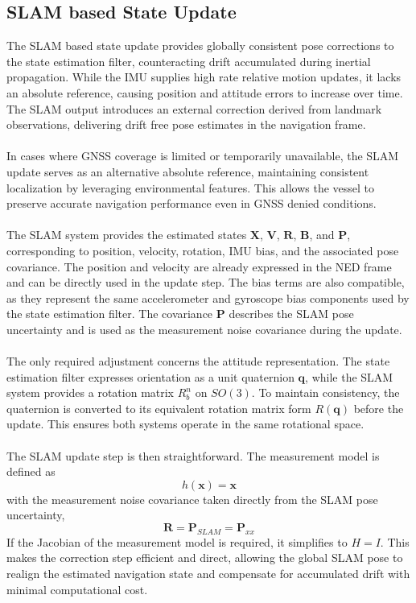 \subsection{SLAM based State Update}
The SLAM based state update provides globally consistent pose corrections to the state estimation filter, counteracting drift accumulated during inertial propagation. While the IMU supplies high rate relative motion updates, it lacks an absolute reference, causing position and attitude errors to increase over time. The SLAM output introduces an external correction derived from landmark observations, delivering drift free pose estimates in the navigation frame.  
\\ \\
In cases where GNSS coverage is limited or temporarily unavailable, the SLAM update serves as an alternative absolute reference, maintaining consistent localization by leveraging environmental features. This allows the vessel to preserve accurate navigation performance even in GNSS denied conditions.
\\ \\
The SLAM system provides the estimated states $\mathbf{X}$, $\mathbf{V}$, $\mathbf{R}$, $\mathbf{B}$, and $\mathbf{P}$, corresponding to position, velocity, rotation, IMU bias, and the associated pose covariance. The position and velocity are already expressed in the NED frame and can be directly used in the update step. The bias terms are also compatible, as they represent the same accelerometer and gyroscope bias components used by the state estimation filter. The covariance $\mathbf{P}$ describes the SLAM pose uncertainty and is used as the measurement noise covariance during the update. 
\\ \\
The only required adjustment concerns the attitude representation. The state estimation filter expresses orientation as a unit quaternion $\mathbf{q}$, while the SLAM system provides a rotation matrix $R_{b}^{n}$ on $SO(3)$. To maintain consistency, the quaternion is converted to its equivalent rotation matrix form $R(\mathbf{q})$ before the update. This ensures both systems operate in the same rotational space.  
\\ \\
The SLAM update step is then straightforward. The measurement model is defined as
$$
    h(\mathbf{x}) = \mathbf{x}
$$
with the measurement noise covariance taken directly from the SLAM pose uncertainty,
$$
    \mathbf{R} = \mathbf{P}_{SLAM} = \mathbf{P}_{xx}
$$
If the Jacobian of the measurement model is required, it simplifies to $H = I$. This makes the correction step efficient and direct, allowing the global SLAM pose to realign the estimated navigation state and compensate for accumulated drift with minimal computational cost.

